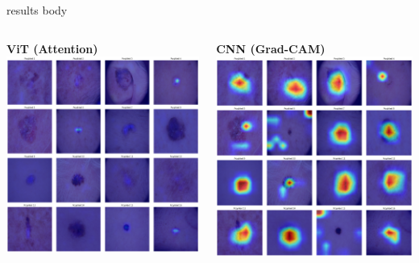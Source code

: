\documentclass[final]{beamer}
\begin{document}
\begin{frame}[t]
\begin{columns}[T]
\begin{column}{.49\linewidth}
{\begin{beamercolorbox}[wd=\linewidth,dp=0.3cm]{results body}
                \begin{columns}[T]
                    \begin{column}{.48\linewidth}
                        \centering
                        \small \textbf{ViT (Attention)}
                        \includegraphics[width=\linewidth]{figures/interpretability_maps_vit.png}
                    \end{column}
                    \begin{column}{.48\linewidth}
                        \centering
                        \small \textbf{CNN (Grad-CAM)}
                        \includegraphics[width=\linewidth]{figures/interpretability_maps_cnn.png}

\end{column}
\end{columns}
\end{beamercolorbox}}
\end{column}
\end{columns}
\end{frame}
\end{document}
